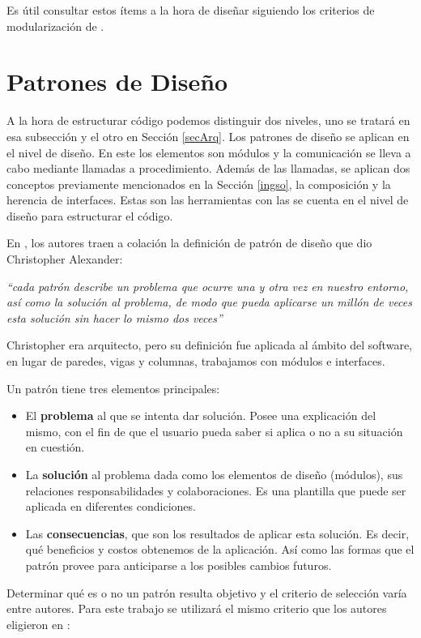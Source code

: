 Es útil consultar estos ítems a la hora de diseñar siguiendo los criterios de modularización de \cite{Parnas1972}.




\section{Patrones de Diseño}

A la hora de estructurar código podemos distinguir dos niveles, uno se tratará en esa subsección y el otro en Sección \ref{secArq}. Los patrones de diseño se aplican en el nivel de diseño. En este los elementos son módulos y la comunicación se lleva a cabo mediante llamadas a procedimiento. Además de las llamadas, se aplican dos conceptos previamente mencionados en la Sección \ref{ingso}, la composición y la herencia de interfaces. Estas son las herramientas con las se cuenta en el nivel de diseño para estructurar el código.

En \cite{Gamma:1995:DPE:186897}, los autores traen a colación la definición de patrón de diseño que dio Christopher Alexander:

\textit{``cada patrón describe un problema que ocurre una y otra vez en nuestro entorno, así como la solución al problema, de modo que pueda aplicarse un millón de veces esta solución sin hacer lo mismo dos veces''}

Christopher era arquitecto, pero su definición fue aplicada al ámbito del software, en lugar de paredes, vigas y columnas, trabajamos con módulos e interfaces.

Un patrón tiene tres elementos principales:

\begin{itemize}
	\item El \textbf{problema} al que se intenta dar solución. Posee una explicación del mismo, con el fin de que el usuario pueda saber si aplica o no a su situación en cuestión.
	\item La \textbf{solución} al problema dada como los elementos de diseño (módulos), sus relaciones responsabilidades y colaboraciones. Es una plantilla que puede ser aplicada en diferentes condiciones.
	\item Las \textbf{consecuencias}, que son los resultados de aplicar esta solución. Es decir, qué beneficios y costos obtenemos de la aplicación. Así como las formas que el patrón provee para anticiparse a los posibles cambios futuros.
\end{itemize}

Determinar qué es o no un patrón resulta objetivo y el criterio de selección varía entre autores. Para este trabajo se utilizará el mismo criterio que los autores eligieron en \cite{Gamma:1995:DPE:186897}:

